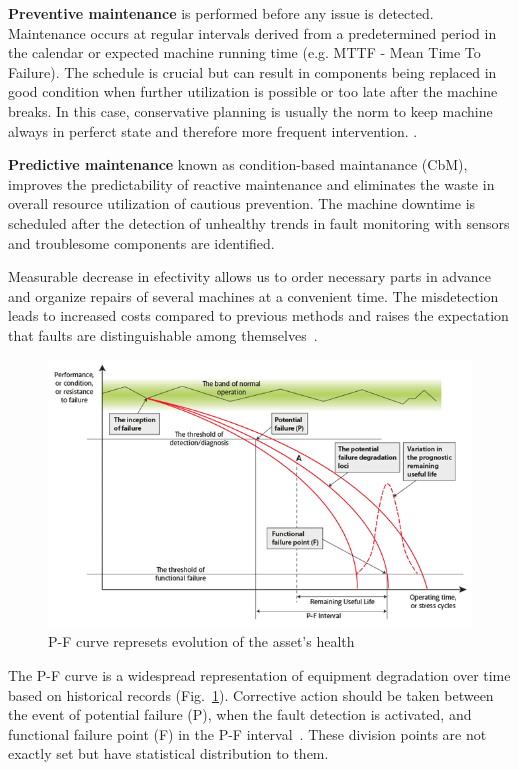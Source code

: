 \textbf{Preventive maintenance} is performed before any issue is detected. Maintenance occurs at regular intervals derived from a predetermined period in the calendar or expected machine running time (e.g. MTTF - Mean Time To Failure). The schedule is crucial but can result in components being replaced in good condition when further utilization is possible or too late after the machine breaks. In this case, conservative planning is usually the norm to keep machine always in perferct state and therefore more frequent intervention. \cite{mohanty_machinery_2015}.  
\bigbreak

\textbf{Predictive maintenance} known as condition-based maintanance (CbM), improves the predictability of reactive maintenance and eliminates the waste in overall resource utilization of cautious prevention. The machine downtime is scheduled after the detection of unhealthy trends in fault monitoring with sensors and troublesome components are identified. 

Measurable decrease in efectivity allows us to order necessary parts in advance and organize repairs of several machines at a convenient time. The misdetection leads to increased costs compared to previous methods and raises the expectation that faults are distinguishable among themselves~\cite{davies_handbook_2012}.

\bigbreak

\begin{figure}[h]
	\centering
	\includegraphics[width=\textwidth]{assets/P-F-Curve.png}
	\caption{P-F curve represets evolution of the asset's health \cite{jennions_integrated_2011}}
	\label{fig:p-f-curve}
\end{figure}

The P-F curve is a widespread representation of equipment degradation over time based on historical records (Fig.~\ref{fig:p-f-curve}). Corrective action should be taken between the event of potential failure (P), when the fault detection is activated, and functional failure point (F) in the P-F interval~\cite{bousdekis_enterprise_2021}.  These division points are not exactly set but have statistical distribution to them.

